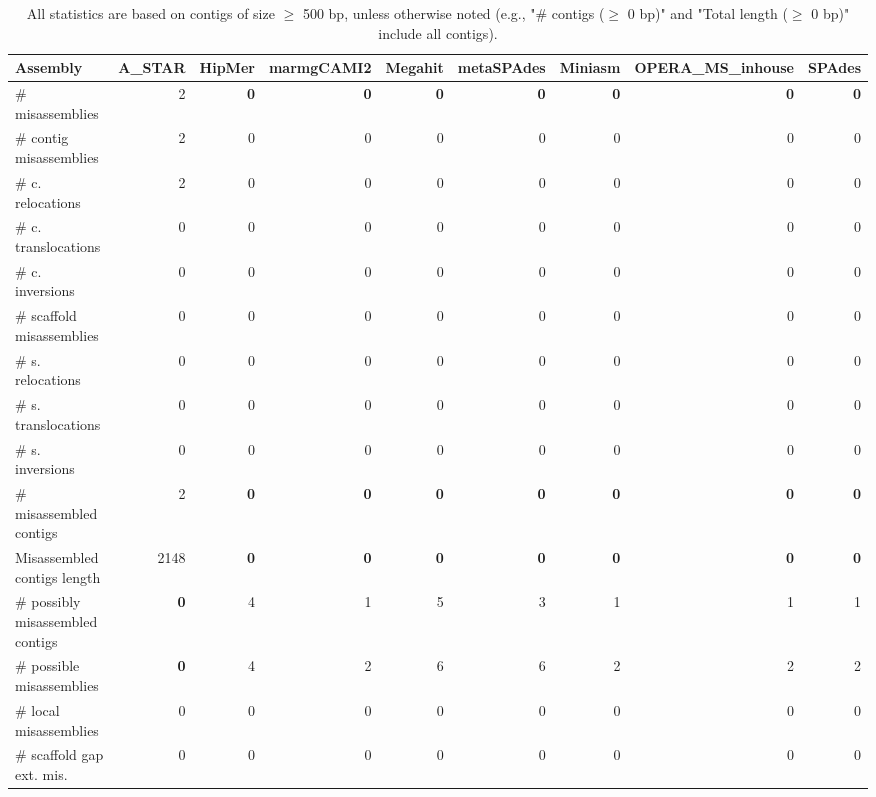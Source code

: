 \documentclass[12pt,a4paper]{article}
\begin{document}
\begin{table}[ht]
\begin{center}
\caption{All statistics are based on contigs of size $\geq$ 500 bp, unless otherwise noted (e.g., "\# contigs ($\geq$ 0 bp)" and "Total length ($\geq$ 0 bp)" include all contigs).}
\begin{tabular}{|l*{8}{|r}|}
\hline
Assembly & A\_STAR & HipMer & marmgCAMI2 & Megahit & metaSPAdes & Miniasm & OPERA\_MS\_inhouse & SPAdes \\ \hline
\# misassemblies & 2 & {\bf 0} & {\bf 0} & {\bf 0} & {\bf 0} & {\bf 0} & {\bf 0} & {\bf 0} \\ \hline
\hspace{2mm}\# contig misassemblies & 2 & 0 & 0 & 0 & 0 & 0 & 0 & 0 \\ \hline
\hspace{5mm}\# c. relocations & 2 & 0 & 0 & 0 & 0 & 0 & 0 & 0 \\ \hline
\hspace{5mm}\# c. translocations & 0 & 0 & 0 & 0 & 0 & 0 & 0 & 0 \\ \hline
\hspace{5mm}\# c. inversions & 0 & 0 & 0 & 0 & 0 & 0 & 0 & 0 \\ \hline
\hspace{2mm}\# scaffold misassemblies & 0 & 0 & 0 & 0 & 0 & 0 & 0 & 0 \\ \hline
\hspace{5mm}\# s. relocations & 0 & 0 & 0 & 0 & 0 & 0 & 0 & 0 \\ \hline
\hspace{5mm}\# s. translocations & 0 & 0 & 0 & 0 & 0 & 0 & 0 & 0 \\ \hline
\hspace{5mm}\# s. inversions & 0 & 0 & 0 & 0 & 0 & 0 & 0 & 0 \\ \hline
\# misassembled contigs & 2 & {\bf 0} & {\bf 0} & {\bf 0} & {\bf 0} & {\bf 0} & {\bf 0} & {\bf 0} \\ \hline
Misassembled contigs length & 2148 & {\bf 0} & {\bf 0} & {\bf 0} & {\bf 0} & {\bf 0} & {\bf 0} & {\bf 0} \\ \hline
\# possibly misassembled contigs & {\bf 0} & 4 & 1 & 5 & 3 & 1 & 1 & 1 \\ \hline
\hspace{5mm}\# possible misassemblies & {\bf 0} & 4 & 2 & 6 & 6 & 2 & 2 & 2 \\ \hline
\# local misassemblies & 0 & 0 & 0 & 0 & 0 & 0 & 0 & 0 \\ \hline
\# scaffold gap ext. mis. & 0 & 0 & 0 & 0 & 0 & 0 & 0 & 0 \\ \hline

\end{tabular}
\end{center}
\end{table}
\end{document}
